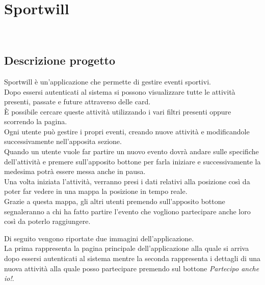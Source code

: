 
\chapter{Sportwill}
\label{cap:Sportwill}

\\


\section{Descrizione progetto}
Sportwill è un'applicazione che permette di gestire eventi sportivi.\\
Dopo essersi autenticati al sistema si possono visualizzare tutte le attività presenti, passate e future attraverso delle card.\\
 È possibile cercare queste attività utilizzando i vari filtri presenti oppure scorrendo la pagina.\\ 
 Ogni utente può gestire i propri eventi, creando nuove attività e modificandole successivamente nell'apposita sezione.\\
 Quando un utente vuole far partire un nuovo evento dovrà andare sulle specifiche dell'attività e premere sull'apposito bottone per farla iniziare e successivamente la medesima potrà essere messa anche in pausa.\\
 Una volta iniziata l'attività, verranno presi i dati relativi alla posizione così da poter far vedere in una mappa la posizione in tempo reale.\\
 Grazie a questa mappa, gli altri utenti premendo sull'apposito bottone segnaleranno a chi ha fatto partire l'evento che vogliono partecipare anche loro così da poterlo raggiungere.
 
 \newpage
 
 Di seguito vengono riportate due immagini dell'applicazione.\\
 La prima rappresenta la pagina principale dell'applicazione alla quale si arriva dopo essersi autenticati al sistema mentre la seconda rappresenta i dettagli di una nuova attività alla quale posso partecipare premendo sul bottone \textit{Partecipo anche io!}.\\
 

